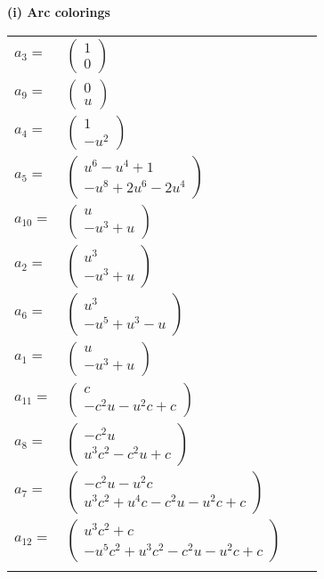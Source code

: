\documentclass[1p]{elsarticle_modified}
\theoremstyle{definition}
\begin{document}
\flushleft \textbf{(i) Arc colorings}\\
\begin{tabular}{m{7pt} m{180pt} m{7pt} m{180pt} }
\flushright $a_{3}=$&$\begin{pmatrix}1\\0\end{pmatrix}$ \\
\flushright $a_{9}=$&$\begin{pmatrix}0\\u\end{pmatrix}$ \\
\flushright $a_{4}=$&$\begin{pmatrix}1\\- u^2\end{pmatrix}$ \\
\flushright $a_{5}=$&$\begin{pmatrix}u^6- u^4+1\\- u^8+2 u^6-2 u^4\end{pmatrix}$ \\
\flushright $a_{10}=$&$\begin{pmatrix}u\\- u^3+u\end{pmatrix}$ \\
\flushright $a_{2}=$&$\begin{pmatrix}u^3\\- u^3+u\end{pmatrix}$ \\
\flushright $a_{6}=$&$\begin{pmatrix}u^3\\- u^5+u^3- u\end{pmatrix}$ \\
\flushright $a_{1}=$&$\begin{pmatrix}u\\- u^3+u\end{pmatrix}$ \\
\flushright $a_{11}=$&$\begin{pmatrix}c\\- c^2 u- u^2 c+c\end{pmatrix}$ \\
\flushright $a_{8}=$&$\begin{pmatrix}- c^2 u\\u^3 c^2- c^2 u+c\end{pmatrix}$ \\
\flushright $a_{7}=$&$\begin{pmatrix}- c^2 u- u^2 c\\u^3 c^2+u^4 c- c^2 u- u^2 c+c\end{pmatrix}$ \\
\flushright $a_{12}=$&$\begin{pmatrix}u^3 c^2+c\\- u^5 c^2+u^3 c^2- c^2 u- u^2 c+c\end{pmatrix}$\\&\end{tabular}
\end{document}
